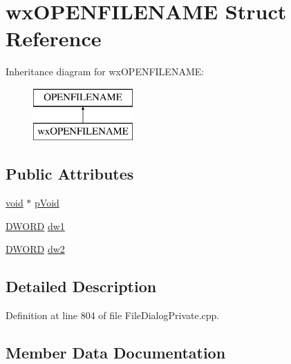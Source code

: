 \hypertarget{structwx_o_p_e_n_f_i_l_e_n_a_m_e}{}\section{wx\+O\+P\+E\+N\+F\+I\+L\+E\+N\+A\+ME Struct Reference}
\label{structwx_o_p_e_n_f_i_l_e_n_a_m_e}
Inheritance diagram for wx\+O\+P\+E\+N\+F\+I\+L\+E\+N\+A\+ME\+:\begin{figure}[H]
\begin{center}
\leavevmode
\includegraphics[height=2.000000cm]{structwx_o_p_e_n_f_i_l_e_n_a_m_e}
\end{center}
\end{figure}
\subsection*{Public Attributes}
\begin{DoxyCompactItemize}
\item 
\hyperlink{sound_8c_ae35f5844602719cf66324f4de2a658b3}{void} $\ast$ \hyperlink{structwx_o_p_e_n_f_i_l_e_n_a_m_e_acf2df046a62d8860ab994c9d7e6a204b}{p\+Void}
\item 
\hyperlink{mapinls_8h_ad342ac907eb044443153a22f964bf0af}{D\+W\+O\+RD} \hyperlink{structwx_o_p_e_n_f_i_l_e_n_a_m_e_ae73d3930e2953ad6504b6e609d470c87}{dw1}
\item 
\hyperlink{mapinls_8h_ad342ac907eb044443153a22f964bf0af}{D\+W\+O\+RD} \hyperlink{structwx_o_p_e_n_f_i_l_e_n_a_m_e_a125d2c8b694346af7785abfe81bcd8dc}{dw2}
\end{DoxyCompactItemize}


\subsection{Detailed Description}


Definition at line 804 of file File\+Dialog\+Private.\+cpp.



\subsection{Member Data Documentation}
